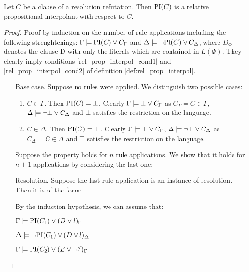 \begin{prop}
	Let $C$ be a clause of a resolution refutation.
	Then $\PI(C)$ is a relative propositional interpolant with respect to $C$. 
\end{prop}
\begin{proof}
	Proof by induction on the number of rule applications including the following strenghtenings:
	$\Gamma \entails \PI(C) \lor C_\Gamma$ and
	$\Delta \entails \lnot \PI(C) \lor C_\Delta$, where $D_\Phi$ denotes the clause D with only the literals which are contained in $L(\Phi)$. They clearly imply conditions \ref{rel_prop_interpol_cond1} and \ref{rel_prop_interpol_cond2} of definition \ref{def:rel_prop_interpol}. 

\begin{itemize}
	\item[Base case.]
	Suppose no rules were applied. We distinguish two possible cases:
	\begin{enumerate}
		\item $C \in \Gamma$.
			Then $\PI(C) = \bot$. Clearly $\Gamma \entails \bot \lor C_\Gamma$ as $C_\Gamma = C \in \Gamma$, $\Delta \entails \lnot \bot \lor C_\Delta$ and $\bot$ satisfies the restriction on the language.

		\item $C \in \Delta$.
			Then $\PI(C) = \top$. Clearly $\Gamma \entails \top \lor C_\Gamma$, $\Delta \entails \lnot \top \lor C_\Delta$ as $C_\Delta = C \in \Delta$ and $\top$ satisfies the restriction on the language.
	\end{enumerate}

	Suppose the property holds for $n$ rule applications.
	We show that it holds for $n+1$ applications by considering the last one:

\item[Resolution.]
	Suppose the last rule application is an instance of resolution. Then it is of the form:
	\begin{prooftree}
	\end{prooftree}

	By the induction hypothesis, we can assume that:

	$\Gamma \entails \PI(C_1) \lor (D\lor l)_\Gamma$

	$\Delta \entails \lnot \PI(C_1) \lor (D\lor l)_\Delta$

	$\Gamma \entails \PI(C_2) \lor (E\lor \lnot l')_\Gamma$


\end{itemize}
\end{proof}
